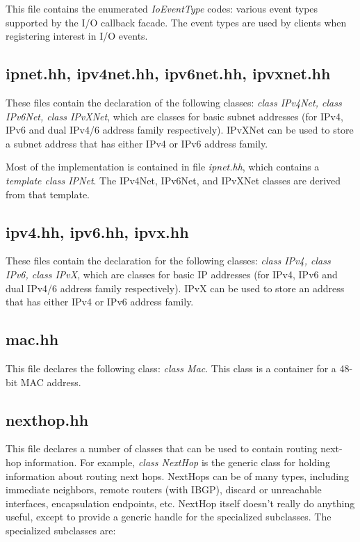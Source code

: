 \documentclass[11pt]{article}
\begin{document}
This file contains the enumerated \emph{IoEventType} codes: various
event types supported by the I/O callback facade. The event types are
used by clients when registering interest in I/O events.

\subsection{ipnet.hh, ipv4net.hh, ipv6net.hh, ipvxnet.hh}

These files contain the declaration of the following classes:
\emph{class IPv4Net, class IPv6Net, class IPvXNet}, which are
classes for basic subnet addresses (for IPv4, IPv6 and dual IPv4/6
address family respectively). IPvXNet can be used to store a subnet
address that has either IPv4 or IPv6 address family.

Most of the implementation is contained in file \emph{ipnet.hh}, which
contains a \emph{template class IPNet}. The IPv4Net, IPv6Net, and
IPvXNet classes are derived from that template.

\subsection{ipv4.hh, ipv6.hh, ipvx.hh}

These files contain the declaration for the following classes:
\emph{class IPv4, class IPv6, class IPvX}, which are
classes for basic IP addresses (for IPv4, IPv6 and dual IPv4/6
address family respectively). IPvX can be used to store an
address that has either IPv4 or IPv6 address family.

\subsection{mac.hh}

This file declares the following class: \emph{class Mac}. 
This class is a container for a 48-bit MAC address.

\subsection{nexthop.hh}

This file declares a number of classes that can be used to contain
routing next-hop information. For example, \emph{class NextHop}
is the generic class for holding information about routing
next hops.  NextHops can be of many types, including immediate
neighbors, remote routers (with IBGP), discard or unreachable interfaces,
encapsulation endpoints, etc.  NextHop itself doesn't really do
anything useful, except to provide a generic handle for the
specialized subclasses. The specialized subclasses are:
\end{document}
